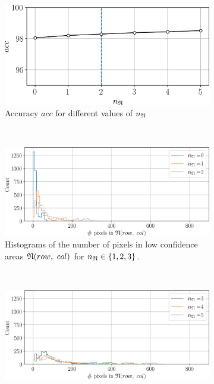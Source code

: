 \begin{figure}
    \centering
    \begin{subfigure}[t]{0.7\linewidth}
        \centering
        \includegraphics[width=\linewidth]{Images/X_Annex/ablation_study_cones_n_N_1.png}
        \caption{Accuracy $acc$ for different values of $n_{\mathfrak{N}}$}
        \label{fig:ablation_study_n_N_acc}
    \end{subfigure}\vspace*{0.3cm}\\
    \begin{subfigure}[t]{0.7\linewidth}
        \centering
        \includegraphics[width=\linewidth]{Images/X_Annex/ablation_study_cones_n_N_2.png}
        \caption{Histograms of the number of pixels in low confidence areas $\mathfrak{N}(row, ~col)$ for $n_{\mathfrak{N}}\in\{1,2,3\}$.}
        \label{fig:ablation_study_n_N_hist_1}
    \end{subfigure}\vspace*{0.3cm}\\
    \begin{subfigure}[t]{0.7\linewidth}
        \centering
        \includegraphics[width=\linewidth]{Images/X_Annex/ablation_study_cones_n_N_3.png}

\end{subfigure}
\end{figure}
